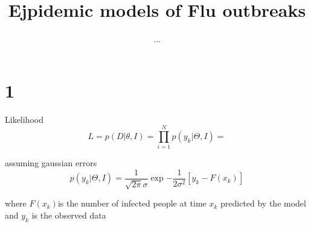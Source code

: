 \documentclass[11pt, a4paper]{article}
\author{...}
\title{Ejpidemic models of Flu outbreaks}
\begin{document}
\maketitle
\section{1}
Likelihood
\begin{equation}
L =  p(D|\theta, I) = \prod_{i=1}^N p(y_k | \Theta,I) = 
\end{equation}

assuming gaussian errors
\begin{equation}
p(y_k | \Theta,I) = \frac{1}{\sqrt{2\pi}\sigma} \exp{-\frac{1}{2\sigma^2}[y_k - F(x_k)]}
\end{equation}

where $F(x_k) $is the number of infected people at time $x_k$ predicted by the model and $y_k$ is the observed data
\end{document}
